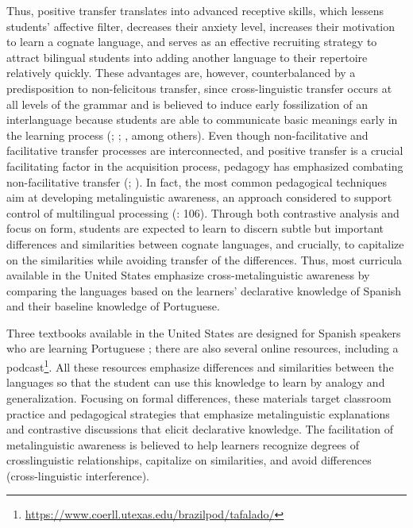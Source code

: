 \documentclass[output=paper]{../langscibook}
\begin{document}
Thus, positive transfer translates into advanced receptive skills, which lessens students’ affective filter, decreases their anxiety level, increases their motivation to learn a cognate language, and serves as an effective recruiting strategy to attract bilingual students into adding another language to their repertoire relatively quickly. These advantages are, however, counterbalanced by a predisposition to non-felicitous transfer, since cross-linguistic transfer occurs at all levels of the grammar and is believed to induce early fossilization of an interlanguage because students are able to communicate basic meanings early in the learning process (\citealt{SimoesKelm1991}; \citealt{Takeuchi1984}; \citealt{CarvalhoEtAl2010}, among others). Even though non-facilitative and facilitative transfer processes are interconnected, and positive transfer is a crucial facilitating factor in the acquisition process, pedagogy has emphasized combating non-facilitative transfer (\citealt{Carvalho2002}; \citealt{CarvalhoChild2018}). In fact, the most common pedagogical techniques aim at developing metalinguistic awareness, an approach considered to support control of multilingual processing (\citealt{Jessner2006}: 106). Through both contrastive analysis and focus on form, students are expected to learn to discern subtle but important differences and similarities between cognate languages, and crucially, to capitalize on the similarities while avoiding transfer of the differences. Thus, most curricula available in the United States emphasize cross-metalinguistic awareness by comparing the languages based on the learners’ declarative knowledge of Spanish and their baseline knowledge of Portuguese. 

Three textbooks available in the United States are designed for Spanish speakers who are learning Portuguese \citep{Simoes1992,Simoes2010,BatemanEtAl2016}; there are also several online resources, including a podcast\footnote{\url{https://www.coerll.utexas.edu/brazilpod/tafalado/}}. All these resources emphasize differences and similarities between the languages so that the student can use this knowledge to learn by analogy and generalization. Focusing on formal differences, these materials target classroom practice and pedagogical strategies that emphasize metalinguistic explanations and contrastive discussions that elicit declarative knowledge. The facilitation of metalinguistic awareness is believed to help learners recognize degrees of crosslinguistic relationships, capitalize on similarities, and avoid differences (cross-linguistic interference). 
\end{document}
